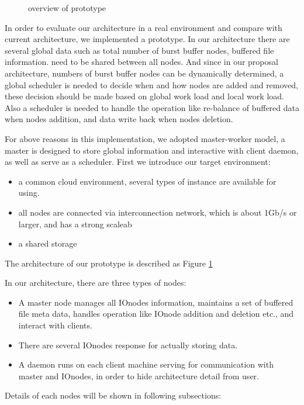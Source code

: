 \begin{figure}
\centering
\caption{overview of prototype}
\label{overview of prototype}
\end{figure}

In order to evaluate our architecture in a real environment and compare with current architecture, we implemented a prototype. 
In our architecture there are several global data such as total number of burst buffer nodes,
buffered file information. need to be shared between all nodes.
And since in our proposal architecture, numbers of burst buffer nodes can be dynamically determined,
a global scheduler is needed to decide when and how nodes are added and removed, these decision should be made based on global work load and local work load.
Also a scheduler is needed to handle the operation like re-balance of buffered data when nodes addition, and data write back when nodes deletion.

For above reasons in this implementation, we adopted master-worker model, a master is designed to store global information and interactive with client daemon, as well as serve as a scheduler.
First we introduce our target environment:
\begin{itemize}
  \item a common cloud environment, several types of instance are available for using.
  \item all nodes are connected via interconnection network, which is about 1Gb/s or larger, and has a strong scaleab
  \item a shared storage 
\end{itemize}
The architecture of our prototype is described as Figure \ref{overview of prototype}

In our architecture, there are three types of nodes:
\begin{itemize}
	\item A master node manages all IOnodes information, maintains a set of buffered file meta data, handles operation like IOnode addition and deletion etc., and interact with clients.
	\item There are several IOnodes response for actually storing data.
	\item A daemon runs on each client machine serving for communication with
	master and IOnodes, in order to hide architecture detail from user.
\end{itemize}

Details of each nodes will be shown in following subsections:

